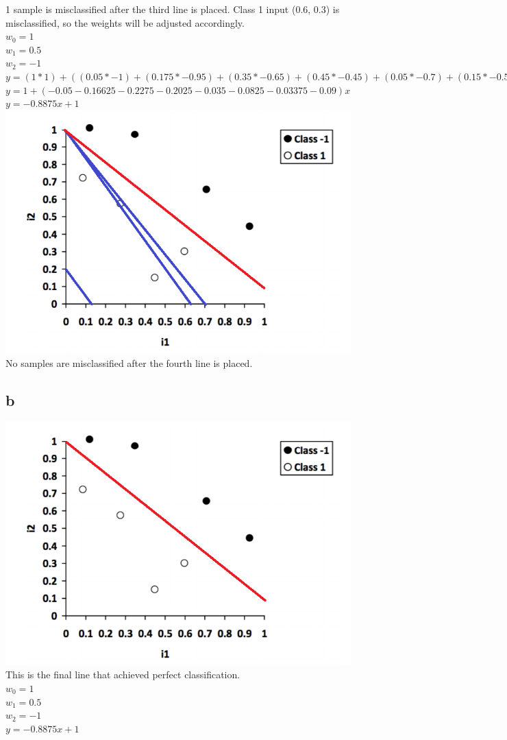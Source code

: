\documentclass[11pt, oneside]{article}   	%
\begin{document}
\begin{flushleft}
1 sample is misclassified after the third line is placed. Class 1 input (0.6, 0.3) is misclassified, so the weights will be adjusted accordingly.\\
$w_0 = 1$\\
$w_1 = 0.5$\\
$w_2 = -1$\\
$y=(1*1)+((0.05*-1)+(0.175*-0.95)+(0.35*-0.65)+(0.45*-0.45)+(0.05*-0.7)+(0.15*-0.55)+(0.225*-0.15)+(0.3*-0.3))x$\\
$y=1+(-0.05-0.16625-0.2275-0.2025-0.035-0.0825-0.03375-0.09)x$\\
$y=-0.8875x+1$\\
\includegraphics[]{q4_4.png}
No samples are misclassified after the fourth line is placed.\\
\subsection*{b}
\includegraphics[]{q4_final.png}
\\
This is the final line that achieved perfect classification.\\
$w_0 = 1$\\
$w_1 = 0.5$\\
$w_2 = -1$\\
$y=-0.8875x+1$\\

\end{flushleft}
\end{document}
